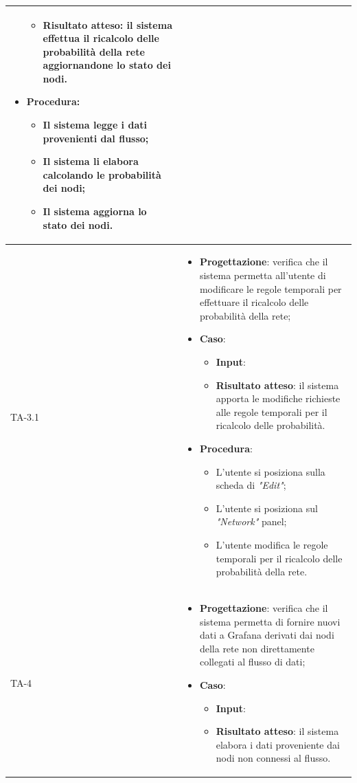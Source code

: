 \begin{longtable}{|C{2.5cm}|C{13cm}|}
\begin{itemize}
\begin{itemize}
		\item \textbf{Risultato atteso}: il sistema effettua il ricalcolo delle probabilità della rete aggiornandone lo stato dei nodi.
	\end{itemize}
	\item \textbf{Procedura}:
	\begin{itemize}
		\item Il sistema legge i dati provenienti dal flusso;
		\item Il sistema li elabora calcolando le probabilità dei nodi;
		\item Il sistema aggiorna lo stato dei nodi.
	\end{itemize} 
\end{itemize}\\
\hline
{TA-3.1} &
\begin{itemize}
	\item \textbf{Progettazione}: verifica che il sistema permetta all'utente di modificare le regole temporali per effettuare il ricalcolo delle probabilità della rete;
	\item \textbf{Caso}: 
	\begin{itemize}
		\item \textbf{Input}: 
		\item \textbf{Risultato atteso}: il sistema apporta le modifiche richieste alle regole temporali per il ricalcolo delle probabilità.
	\end{itemize}
	\item \textbf{Procedura}:
	\begin{itemize}
		\item L'utente si posiziona sulla scheda di \emph{"Edit"};
		\item L'utente si posiziona sul \emph{"Network"} panel;
		\item L'utente modifica le regole temporali per il ricalcolo delle probabilità della rete.
	\end{itemize} 
\end{itemize} \\
\hline
{TA-4} &
\begin{itemize}
	\item \textbf{Progettazione}: verifica che il sistema permetta di fornire nuovi dati a Grafana derivati dai nodi della rete non direttamente collegati al flusso di
	dati;
	\item \textbf{Caso}: 
	\begin{itemize}
		\item \textbf{Input}:
		\item \textbf{Risultato atteso}: il sistema elabora i dati proveniente dai nodi non connessi al flusso.

\end{itemize}
\end{itemize}
\end{longtable}
